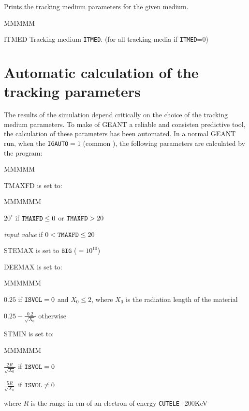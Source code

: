 Prints the tracking medium parameters for the given medium.
\begin{DL}{MMMMM}
\item[ITMED]      Tracking medium {\tt ITMED}.
                  (for all tracking media if {\tt ITMED}=0)
\end{DL}

\section{Automatic calculation of the tracking parameters}

The results of the simulation depend critically on the choice of the tracking
medium parameters. To make of GEANT a reliable and consisten predictive
tool, the calculation of these parameters has been automated.
In a normal GEANT run, when the {\tt IGAUTO}$=1$
(common ), the following parameters are calculated by the program:
\begin{DL}{MMMMM}
\item[TMAXFD]    is set to:
\begin{DL}{MMMMMM}
\item[$20^\circ$]      if ${\tt TMAXFD}\leq 0$ or ${\tt TMAXFD} > 20$
\item[{\it input value}]     if $0 < {\tt TMAXFD}\leq 20$
\end{DL}
\item[STEMAX] is set to {\tt BIG} ($=10^{10}$)
\item[DEEMAX] is set to:
\begin{DL}{MMMMMM}
\item[$0.25$]    if ${\tt ISVOL} = 0$ and $X_{0} \leq 2$, where $X_{0}$ is the
               radiation length of the material \vspace{.3cm}
\item[$0.25-\displaystyle{\frac{0.2}{\sqrt{X_{0}}}}$] otherwise
\end{DL}
\item[STMIN] is set to: \vspace{.3cm}
\begin{DL}{MMMMMM}
\item[$\displaystyle{\frac{2 R}{\sqrt{X_{0}}}}$] if ${\tt ISVOL} = 0$
                                \vspace{.3cm}
\item[$\displaystyle{\frac{5 R}{\sqrt{X_{0}}}}$] if ${\tt ISVOL} \neq 0$
                                \vspace{.3cm}
\end{DL}
where $R$ is the range in cm of an electron of energy {\tt CUTELE}+200KeV
\end{DL}

